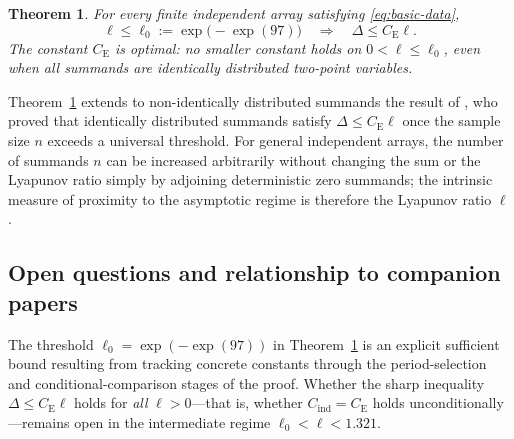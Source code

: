 \documentclass[11pt]{article}
\numberwithin{equation}{section}
\newtheorem{theorem}{Theorem}[section]
\theoremstyle{remark}
\newcommand{\be}{C_{\mathrm E}}
\newcommand{\Cind}{C_{\mathrm{ind}}}
\begin{document}
\begin{theorem}\label{thm:main}
For every finite independent array satisfying \eqref{eq:basic-data},
\[
 \boxed{\quad\ell\le\ell_0:=\exp\bigl(-\exp(97)\bigr)
          \quad\Longrightarrow\quad\Delta\le\be\ell.\quad}
\]
The constant $\be$ is optimal: no smaller constant holds on $0<\ell\le\ell_0$,
even when all summands are identically distributed two-point variables.
\end{theorem}

Theorem~\ref{thm:main} extends to non-identically distributed summands the
result of \citet[Theorem~1.1]{HeChengCurrent2026}, who proved that identically
distributed summands satisfy $\Delta\le\be\ell$ once the sample size $n$
exceeds a universal threshold. For general independent arrays, the number of
summands $n$ can be increased arbitrarily without changing the sum or the
Lyapunov ratio simply by adjoining deterministic zero summands; the intrinsic
measure of proximity to the asymptotic regime is therefore the Lyapunov
ratio $\ell$.

\subsection{Open questions and relationship to companion papers}

The threshold $\ell_0=\exp(-\exp(97))$ in Theorem~\ref{thm:main} is an
explicit sufficient bound resulting from tracking concrete constants through
the period-selection and conditional-comparison stages of the proof. Whether
the sharp inequality $\Delta\le\be\ell$ holds for \emph{all} $\ell>0$---that
is, whether $\Cind=\be$ holds unconditionally---remains open in the
intermediate regime $\ell_0<\ell<1.321$.
\end{document}

